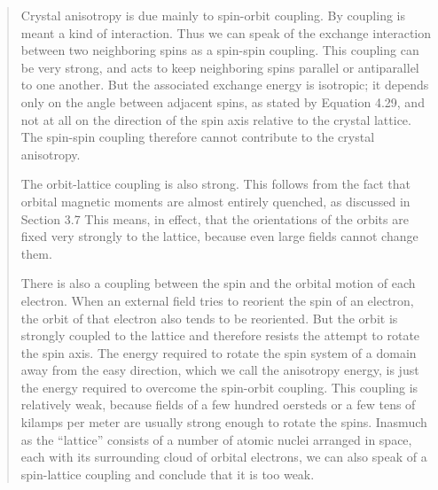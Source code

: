 \documentclass[12pt]{article}
\begin{document}
\begin{quote}
Crystal anisotropy is due mainly to spin-orbit coupling. By coupling is meant a kind of interaction. Thus we can speak of the exchange interaction between two neighboring spins as a spin-spin coupling. This coupling can be very strong, and acts to keep neighboring spins parallel or antiparallel to one another. But the associated exchange energy is isotropic; it depends only on the angle between adjacent spins, as stated by Equation 4.29, and not at all on the direction of the spin axis relative to the crystal lattice. The spin-spin coupling therefore cannot contribute to the crystal anisotropy.


The orbit-lattice coupling is also strong. This follows from the fact that orbital magnetic moments are almost entirely quenched, as discussed in Section 3.7 This means, in effect, that the orientations of the orbits are fixed very strongly to the lattice, because even large fields cannot change them.


There is also a coupling between the spin and the orbital motion of each electron. When an external field tries to reorient the spin of an electron, the orbit of that electron also tends to be reoriented. But the orbit is strongly coupled to the lattice and therefore resists the attempt to rotate the spin axis. The energy required to rotate the spin system of a domain away from the easy direction, which we call the anisotropy energy, is just the energy required to overcome the spin-orbit coupling. This coupling is relatively weak, because fields of a few hundred oersteds or a few tens of kilamps per meter are usually strong enough to rotate the spins. Inasmuch as the “lattice” consists of a number of atomic nuclei arranged in space, each with its surrounding cloud of orbital electrons, we can also speak of a spin-lattice coupling and conclude that it is too weak.

\end{quote}
\end{document}
